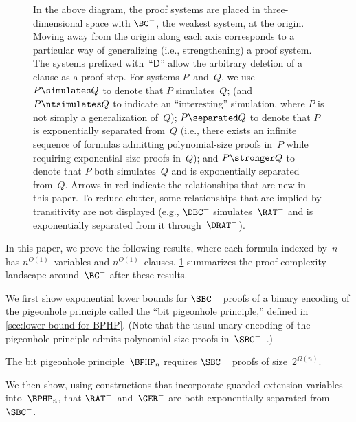 \documentclass[10pt,a4paper]{article}
\begin{document}
\begin{figure}[!ht]
  \caption{In the above diagram, the proof systems are placed in
    three-dimensional space with $\BC^-$, the weakest system, at the origin.
    Moving away from the origin along each axis
    corresponds to a particular way of generalizing
    (i.e., strengthening) a proof system.
    The systems prefixed with~``$\mathsf{D}$'' allow
    the arbitrary deletion of a clause as a proof step.
    For systems $P$~and~$Q$, we use
    $P \simulates Q$ to denote that $P$ simulates~$Q$;
    (and $P \ntsimulates Q$ to indicate an ``interesting'' simulation,
    where $P$ is not simply a generalization of~$Q$);
    $P \separated Q$ to denote that $P$ is exponentially separated from~$Q$
    (i.e., there exists an infinite sequence of formulas
    admitting polynomial-size proofs in~$P$
    while requiring exponential-size proofs in~$Q$);
    and $P \stronger Q$ to denote that $P$ both simulates~$Q$
    and is exponentially separated from~$Q$.
    Arrows in \textcolor{customred}{red}
    indicate the relationships that are new in this paper.
    To reduce clutter, some relationships that are implied by transitivity
    are not displayed (e.g., $\DBC^-$ simulates~$\RAT^-$
    and is exponentially separated from it through~$\DRAT^-$).}
  \label{fig:redundancy-landscape}
\end{figure}

In this paper, we prove the following results, where each formula indexed by~$n$
has $n^{O(1)}$~variables and $n^{O(1)}$~clauses.
\cref{fig:redundancy-landscape} summarizes
the proof complexity landscape around~$\BC^-$ after these results.

We first show exponential lower bounds for $\SBC^-$~proofs
of a binary encoding of the pigeonhole principle
called the ``bit pigeonhole principle,''
defined in \cref{sec:lower-bound-for-BPHP}.
(Note that the usual unary encoding of the pigeonhole principle
admits polynomial-size proofs in~$\SBC^-$~\cite[Lemma~7.1]{YH23}.)

\begin{theorem}\label{thm:SBC-lower-bound}
  The bit pigeonhole principle~$\BPHP_n$
  requires $\SBC^-$~proofs of size~$2^{\Omega(n)}$.
\end{theorem}

We then show, using constructions that incorporate
guarded extension variables into~$\BPHP_n$,
that $\RAT^-$~and~$\GER^-$ are both exponentially separated from~$\SBC^-$.
\end{document}
